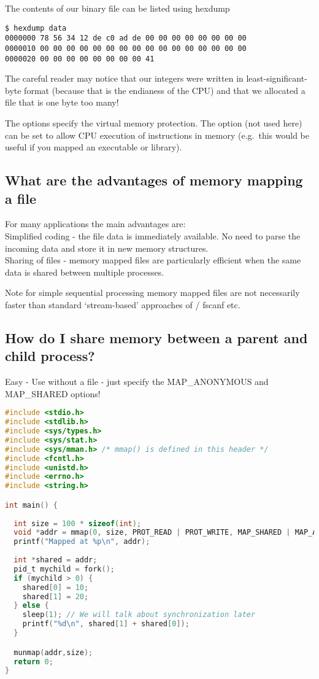 The contents of our binary file can be listed using hexdump

\begin{lstlisting}
$ hexdump data
0000000 78 56 34 12 de c0 ad de 00 00 00 00 00 00 00 00
0000010 00 00 00 00 00 00 00 00 00 00 00 00 00 00 00 00
0000020 00 00 00 00 00 00 00 00 41   
\end{lstlisting}

The careful reader may notice that our integers were written in least-significant-byte format (because that is the endianess of the CPU) and that we allocated a file that is one byte too many!

The  options specify the virtual memory protection. The option  (not used here) can be set to allow CPU execution of instructions in memory (e.g.~this would be useful if you mapped an executable or library).

\subsection{What are the advantages of memory mapping a file}\label{what-are-the-advantages-of-memory-mapping-a-file}

For many applications the main advantages are:\\
Simplified coding - the file data is immediately available. No need to parse the incoming data and store it in new memory structures.\\
Sharing of files - memory mapped files are particularly efficient when the same data is shared between multiple processes.

Note for simple sequential processing memory mapped files are not necessarily faster than standard `stream-based' approaches of  / fscanf etc.

\subsection{How do I share memory between a parent and child process?}\label{how-do-i-share-memory-between-a-parent-and-child-process}

Easy - Use  without a file - just specify the MAP\_ANONYMOUS and MAP\_SHARED options!

\begin{lstlisting}[language=C]
#include <stdio.h>
#include <stdlib.h>
#include <sys/types.h>
#include <sys/stat.h>
#include <sys/mman.h> /* mmap() is defined in this header */
#include <fcntl.h>
#include <unistd.h>
#include <errno.h>
#include <string.h>

int main() {
  
  int size = 100 * sizeof(int);  
  void *addr = mmap(0, size, PROT_READ | PROT_WRITE, MAP_SHARED | MAP_ANONYMOUS, -1, 0);
  printf("Mapped at %p\n", addr);
  
  int *shared = addr;
  pid_t mychild = fork();
  if (mychild > 0) {
    shared[0] = 10;
    shared[1] = 20;
  } else {
    sleep(1); // We will talk about synchronization later
    printf("%d\n", shared[1] + shared[0]);
  }

  munmap(addr,size);
  return 0;
}
\end{lstlisting}

